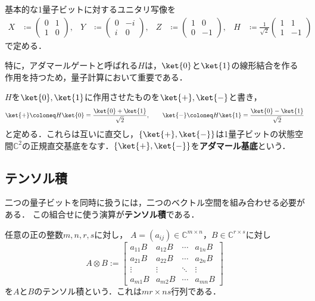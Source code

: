\begin{defi}
  基本的な1量子ビットに対するユニタリ写像を
  \begin{align*}
    X & \coloneq\begin{pmatrix}0&1\\1&0\end{pmatrix},                    &
    Y & \coloneq\begin{pmatrix}0&-i\\i&0\end{pmatrix}, &
    Z & \coloneq\begin{pmatrix}1&0\\0&-1\end{pmatrix},                   &
    H & \coloneq\frac1{\sqrt2}\begin{pmatrix}1&1\\1&-1\end{pmatrix}
  \end{align*}
  で定める．
\end{defi}

特に，アダマールゲートと呼ばれる$H$は，$\ket{0}$と$\ket{1}$の線形結合を作る作用を持つため，量子計算において重要である．
\begin{defi}[アダマール基底]
  $H$を$\ket{0}, \ket{1}$に作用させたものを$\ket{+}, \ket{-}$と書き，
  \begin{equation*}
    \ket{+}\coloneq H\ket{0}=\frac{\ket{0}+\ket{1}}{\sqrt2},
    \qquad
    \ket{-} \coloneq H\ket{1}=\frac{\ket{0}-\ket{1}}{\sqrt2}
  \end{equation*}
  と定める．これらは互いに直交し，$\{\ket{+},\ket{-}\}$は1量子ビットの状態空間$\mathbb C^2$の正規直交基底をなす．$\{\ket{+},\ket{-}\}$を\textbf{アダマール基底}という．
\end{defi}

\subsection{テンソル積}

二つの量子ビットを同時に扱うには，二つのベクトル空間を組み合わせる必要がある．
この組合せに使う演算が\textbf{テンソル積}である．

\begin{defi}[行列のテンソル積]
  任意の正の整数$m,n,r,s$に対し，
  $A=(a_{ij})\in\mathbb{C}^{m\times n}$，$B\in\mathbb{C}^{r\times s}$に対し
  \begin{equation*}
    A\otimes B
    :=
    \begin{bmatrix}
      a_{11}B & a_{12}B & \cdots & a_{1n}B \\
      a_{21}B & a_{22}B & \cdots & a_{2n}B \\
      \vdots  & \vdots  & \ddots & \vdots  \\
      a_{m1}B & a_{m2}B & \cdots & a_{mn}B
    \end{bmatrix}
  \end{equation*}
  を$A$と$B$のテンソル積という．これは$mr\times ns$行列である．
\end{defi}

